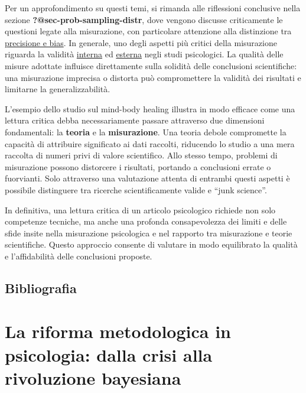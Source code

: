 \documentclass[
  letterpaper,
]{krantz}
\begin{document}
Per un approfondimento su questi temi, si rimanda alle riflessioni
conclusive nella sezione \textbf{?@sec-prob-sampling-distr}, dove
vengono discusse criticamente le questioni legate alla misurazione, con
particolare attenzione alla distinzione tra
\href{https://en.wikipedia.org/wiki/Accuracy_and_precision}{precisione e
bias}. In generale, uno degli aspetti più critici della misurazione
riguarda la validità
\href{https://en.wikipedia.org/wiki/Internal_validity}{interna} ed
\href{https://en.wikipedia.org/wiki/External_validity}{esterna} negli
studi psicologici. La qualità delle misure adottate influisce
direttamente sulla solidità delle conclusioni scientifiche: una
misurazione imprecisa o distorta può compromettere la validità dei
risultati e limitarne la generalizzabilità.

L'esempio dello studio sul mind-body healing illustra in modo efficace
come una lettura critica debba necessariamente passare attraverso due
dimensioni fondamentali: la \textbf{teoria} e la \textbf{misurazione}.
Una teoria debole compromette la capacità di attribuire significato ai
dati raccolti, riducendo lo studio a una mera raccolta di numeri privi
di valore scientifico. Allo stesso tempo, problemi di misurazione
possono distorcere i risultati, portando a conclusioni errate o
fuorvianti. Solo attraverso una valutazione attenta di entrambi questi
aspetti è possibile distinguere tra ricerche scientificamente valide e
``junk science''.

In definitiva, una lettura critica di un articolo psicologico richiede
non solo competenze tecniche, ma anche una profonda consapevolezza dei
limiti e delle sfide insite nella misurazione psicologica e nel rapporto
tra misurazione e teorie scientifiche. Questo approccio consente di
valutare in modo equilibrato la qualità e l'affidabilità delle
conclusioni proposte.

\section*{Bibliografia}\label{bibliografia-3}


\chapter{La riforma metodologica in psicologia: dalla crisi alla
rivoluzione bayesiana}\label{sec-data-science}
\end{document}
